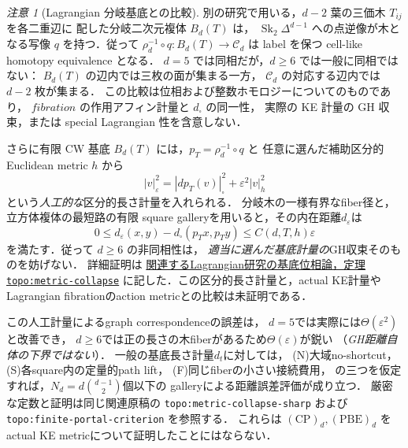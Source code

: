 \documentclass[a4paper,11pt]{ltjsarticle}
\numberwithin{equation}{section}
\theoremstyle{plain}
\theoremstyle{definition}
\theoremstyle{remark}
\newtheorem{remark}[remark]{注意}
\newcommand{\Cd}{\mathcal C_d}
\begin{document}
\begin{remark}[Lagrangian 分岐基底との比較]\label{rem:degree-d-lagrangian-base}
別の研究で用いる，$d-2$ 葉の三価木 $T_{ij}$ を各二重辺に
配した分岐二次元複体 $B_d(T)$ は，
$\operatorname{Sk}_2\Delta^{d-1}$ への点逆像が木となる写像 $q$
を持つ．従って $\rho_d^{-1}\circ q:B_d(T)\to\Cd$ は
label を保つ cell-like homotopy equivalence となる．
$d=5$ では同相だが，$d\ge6$ では一般に同相ではない：
$B_d(T)$ の辺内では三枚の面が集まる一方，
$\Cd$ の対応する辺内では $d-2$ 枚が集まる．
この比較は位相および整数ホモロジーについてのものであり，
$fibration$ の作用アフィン計量と $d_\square$ の同一性，
実際の KE 計量の GH 収束，または special Lagrangian 性を含意しない．

さらに有限 CW 基底 $B_d(T)$ には，$p_T=\rho_d^{-1}\circ q$ と
任意に選んだ補助区分的 Euclidean metric $h$ から
\[
 |v|_\varepsilon^2=|dp_T(v)|_\square^2+\varepsilon^2|v|_h^2
\]
という\emph{人工的な}区分的長さ計量を入れられる．
分岐木の一様有界なfiber径と，立方体複体の最短路の有限
square galleryを用いると，その内在距離$d_\varepsilon$は
\[
 0\le d_\varepsilon(x,y)
       -d_\square(p_Tx,p_Ty)\le C(d,T,h)\varepsilon
\]
を満たす．従って $d\ge6$ の非同相性は，
\emph{適当に選んだ基底計量の}GH収束そのものを妨げない．
詳細証明は
\href{https://github.com/uedakazushi/surface-lagrangian-torus-fibration/blob/main/papers/sections/paper/base_topology.tex}
{関連するLagrangian研究の基底位相論，定理 \texttt{topo:metric-collapse}}
に記した．この区分的長さ計量と，actual KE計量や
Lagrangian fibrationのaction metricとの比較は未証明である．

この人工計量によるgraph correspondenceの誤差は，
$d=5$では実際には$\Theta(\varepsilon^2)$と改善でき，
$d\ge6$では正の長さの木fiberがあるため$\Theta(\varepsilon)$が鋭い
（\emph{GH距離自体の下界ではない}）．
一般の基底長さ計量$d_t$に対しては，
\textup{(N)}大域no-shortcut，
\textup{(S)}各square内の定量的path lift，
\textup{(F)}同じfiberの小さい接続費用，
の三つを仮定すれば，$N_d=d\binom{d-1}{2}$個以下の
galleryによる距離誤差評価が成り立つ．
厳密な定数と証明は同じ関連原稿の
\texttt{topo:metric-collapse-sharp} および
\texttt{topo:finite-portal-criterion} を参照する．
これらは $\mathrm{(CP)}_d,\mathrm{(PBE)}_d$ を
actual KE metricについて証明したことにはならない．
\end{remark}
\end{document}
